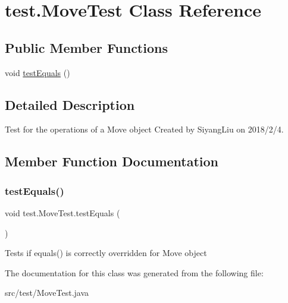 \hypertarget{classtest_1_1_move_test}{}\section{test.\+Move\+Test Class Reference}
\label{classtest_1_1_move_test}
\subsection*{Public Member Functions}
\begin{DoxyCompactItemize}
\item 
void \mbox{\hyperlink{classtest_1_1_move_test_a80a01eeb7d7f45416b2b14f28b44eea0}{test\+Equals}} ()
\end{DoxyCompactItemize}


\subsection{Detailed Description}
Test for the operations of a Move object Created by Siyang\+Liu on 2018/2/4. 

\subsection{Member Function Documentation}
\mbox{\label{classtest_1_1_move_test_a80a01eeb7d7f45416b2b14f28b44eea0}} 
\subsubsection{\texorpdfstring{test\+Equals()}{testEquals()}}
{\footnotesize\ttfamily void test.\+Move\+Test.\+test\+Equals (\begin{DoxyParamCaption}{ }\end{DoxyParamCaption})}

Tests if equals() is correctly overridden for Move object 

The documentation for this class was generated from the following file\+:\begin{DoxyCompactItemize}
\item 
src/test/Move\+Test.\+java\end{DoxyCompactItemize}

